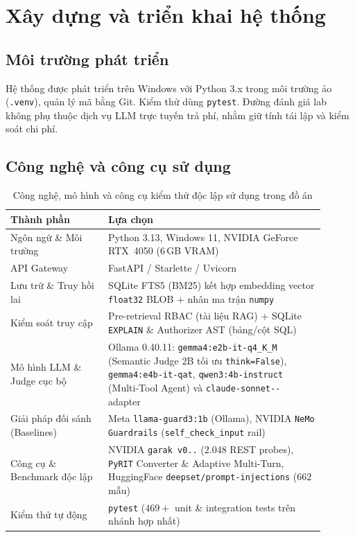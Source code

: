 \chapter{Xây dựng và triển khai hệ thống}
\label{ch:xay-dung}

\section{Môi trường phát triển}

Hệ thống được phát triển trên Windows với Python 3.x trong môi trường ảo (\texttt{.venv}), quản lý mã bằng Git. Kiểm thử dùng \texttt{pytest}. Đường đánh giá lab không phụ thuộc dịch vụ LLM trực tuyến trả phí, nhằm giữ tính tái lập và kiểm soát chi phí.

\section{Công nghệ và công cụ sử dụng}

\begin{table}[!htbp]
\centering
\caption{Công nghệ, mô hình và công cụ kiểm thử độc lập sử dụng trong đồ án}
\label{tab:tech}
\begin{tabular}{@{}L{0.28\linewidth}L{0.62\linewidth}@{}}
\toprule
\textbf{Thành phần} & \textbf{Lựa chọn} \\
\midrule
Ngôn ngữ \& Môi trường & Python 3.13, Windows 11, NVIDIA GeForce RTX~4050 (6\,GB VRAM) \\
API Gateway & FastAPI / Starlette / Uvicorn \\
Lưu trữ \& Truy hồi lai & SQLite FTS5 (BM25) kết hợp embedding vector \texttt{float32} BLOB + nhân ma trận \texttt{numpy} \\
Kiểm soát truy cập & Pre-retrieval RBAC (tài liệu RAG) + SQLite \texttt{EXPLAIN} \& Authorizer AST (bảng/cột SQL) \\
Mô hình LLM \& Judge cục bộ & Ollama 0.40.11: \texttt{gemma4:e2b-\allowbreak it-\allowbreak q4\_\allowbreak K\_\allowbreak M} (Semantic Judge 2B tối ưu \texttt{think=False}), \texttt{gemma4:e4b-\allowbreak it-\allowbreak qat}, \texttt{qwen3:4b-\allowbreak instruct} (Multi-Tool Agent) và \texttt{claude-\allowbreak sonnet--} adapter \\
Giải pháp đối sánh (Baselines) & Meta \texttt{llama-\allowbreak guard3:1b} (Ollama), NVIDIA \texttt{NeMo Guardrails} (\texttt{self\_\allowbreak check\_\allowbreak input} rail) \\
Công cụ \& Benchmark độc lập & NVIDIA \texttt{garak v0..} ($2.048$ REST probes), \texttt{PyRIT} Converter \& Adaptive Multi-Turn, HuggingFace \texttt{deepset/\allowbreak prompt-\allowbreak injections} ($662$ mẫu) \\
Kiểm thử tự động & \texttt{pytest} ($469+$ unit \& integration tests trên nhánh hợp nhất) \\
\bottomrule
\end{tabular}
\end{table}

